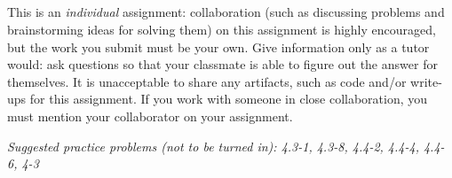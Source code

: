 \documentclass[letterpaper,11pt]{article}
\begin{document}


 \\

 \\
\noindent{} \\

 \\

This is an \emph{individual} assignment: collaboration (such as discussing problems and brainstorming ideas for solving them) on this assignment is highly encouraged, but the work you submit must be your own. Give information only as a tutor would: ask questions so that your classmate is able to figure out the answer for themselves. It is unacceptable to share any artifacts, such as code and/or write-ups for this assignment. If you work with someone in close collaboration, you must mention your collaborator on your assignment.

\emph{Suggested practice problems (not to be turned in): 4.3-1, 4.3-8, 4.4-2, 4.4-4, 4.4-6, 4-3}
\end{document}
